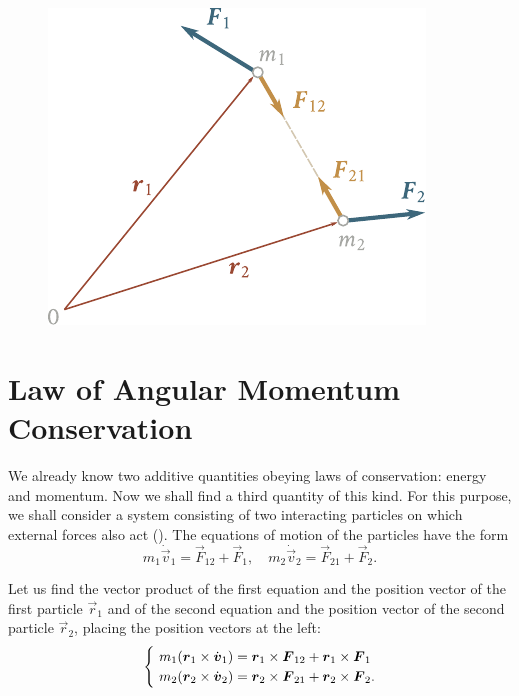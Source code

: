 \begin{figure}[t]
	\begin{center}
		\includegraphics[scale=1]{figures/ch_03/fig_3_17.pdf}
		\caption[]{}
		\label{fig:3_17}
	\end{center}
	\vspace{-0.7cm}
\end{figure}

\section{Law of Angular Momentum Conservation}\label{sec:3_12}

We already know two additive quantities obeying laws of conservation: energy and momentum. Now we shall find a third quantity of this kind. For this purpose, we shall consider a system consisting of two interacting particles on which external forces also act (). The equations of motion of the particles have the form
\begin{equation*}
m_1\dot{\vec{v}}_1 = \vec{F}_{12} + \vec{F}_1,\quad m_2\dot{\vec{v}}_2 = \vec{F}_{21} + \vec{F}_2.
\end{equation*}

\noindent
Let us find the vector product of the first equation and the position vector of the first particle $\vec{r}_1$ and of the second equation and the position vector of the second particle $\vec{r}_2$, placing the position vectors at the left:
\begin{equation}\label{eq:3_101}
\begin{cases}
& \!\!\!\! m_1(\vec{r}_1\times\dot{\vec{v}}_1) = \vecprodind{r}{1}{F}{12} + \vecprodind{r}{1}{F}{1}\\
& \!\!\!\! m_2(\vec{r}_2\times\dot{\vec{v}}_2) = \vecprodind{r}{2}{F}{21} + \vecprodind{r}{2}{F}{2}.
\end{cases}
\end{equation}


